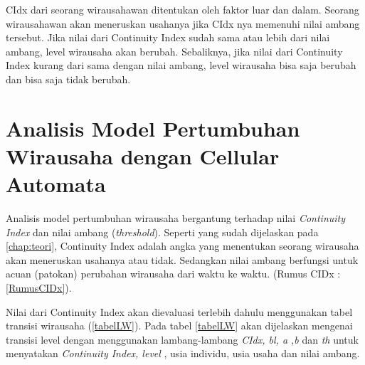 CIdx dari seorang wirausahawan ditentukan oleh faktor luar dan dalam. Seorang wirausahawan akan meneruskan usahanya jika CIdx nya memenuhi nilai ambang tersebut. Jika nilai dari Continuity Index sudah sama atau lebih dari nilai ambang, level wirausaha akan berubah. Sebaliknya, jika nilai dari Continuity Index kurang dari sama dengan nilai ambang, level wirausaha bisa saja berubah dan bisa saja tidak berubah.

\section{Analisis Model Pertumbuhan Wirausaha dengan Cellular Automata}
\label{analisismodelCA}

Analisis model pertumbuhan wirausaha bergantung terhadap nilai \textit{Continuity Index} dan nilai ambang (\textit{threshold}). Seperti yang sudah dijelaskan pada \ref{chap:teori}, Continuity Index adalah angka yang menentukan seorang wirausaha akan meneruskan usahanya atau tidak. Sedangkan nilai ambang berfungsi untuk acuan (patokan) perubahan wirausaha dari waktu ke waktu. (Rumus CIDx : \ref{RumusCIDx}).


Nilai dari Continuity Index akan dievaluasi terlebih dahulu menggunakan tabel transisi wirausaha (\ref{tabelLW}). Pada tabel \ref{tabelLW} akan dijelaskan mengenai transisi level dengan menggunakan lambang-lambang \textit{CIdx, bl, a ,b} dan \textit{th} untuk menyatakan \textit{Continuity Index, level} , usia individu, usia usaha dan nilai ambang.


